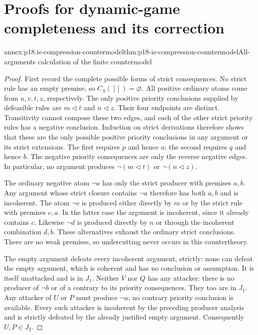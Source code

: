 \chapter{Proofs for dynamic-game completeness and its correction}
\label{annex:p18-is-dynamic-completeness}

\begin{annexitem}{annex:p18.is-compression-countermodel}{thm:p18-is-compression-countermodel}{All-arguments calculation of the finite countermodel}
\begin{proof}
First record the complete possible forms of strict consequences.
No strict rule has an empty premise, so \(C_S([])=\varnothing\).
All positive ordinary atoms come from \(u,v,t,z\), respectively.
The only positive priority conclusions supplied by defeasible rules
are \(m\triangleleft t\) and \(n\triangleleft z\).
Their four endpoints are distinct. Transitivity cannot compose
these two edges, and each of the other strict priority rules has
a negative conclusion. Induction on strict derivations therefore
shows that these are the only possible positive priority conclusions
in any argument or its strict extensions. The first requires \(p\)
and hence \(a\); the second requires \(q\) and hence \(b\).
The negative priority consequences are only the reverse negative
edges. In particular, no argument produces
\(\neg(m\triangleleft t)\) or \(\neg(n\triangleleft z)\).

The ordinary negative atom \(\neg a\) has only the strict producer
with premises \(a,b\). Any argument whose strict closure contains
\(\neg a\) therefore has both \(a,b\) and is incoherent.
The atom \(\neg c\) is produced either directly by \(m\) or by
the strict rule with premises \(c,a\). In the latter case the
argument is incoherent, since it already contains \(c\).
Likewise \(\neg d\) is produced directly by \(n\) or through the
incoherent combination \(d,b\). These alternatives exhaust the
ordinary strict conclusions. There are no weak premises, so
undercutting never occurs in this countertheory.

The empty argument defeats every incoherent argument, strictly:
none can defeat the empty argument, which is coherent and has
no conclusion or assumption. It is itself unattacked and is in
\(J_1\). Neither \(V\) nor \(Q\) has any attacker: there is no
producer of \(\neg b\) or of a contrary to its priority consequences.
They too are in \(J_1\).
Any attacker of \(U\) or \(P\) must produce \(\neg a\);
no contrary priority conclusion is available. Every such attacker
is incoherent by the preceding producer analysis and is strictly
defeated by the already justified empty argument.
Consequently \(U,P\in J_2\).


\end{proof}
\end{annexitem}
